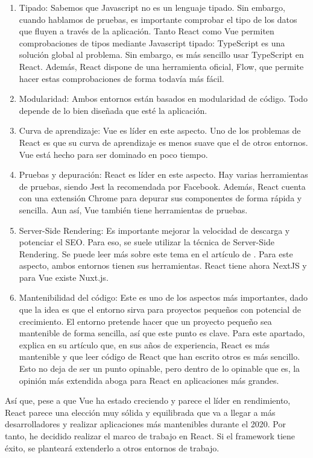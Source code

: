 \begin{enumerate}
	\item Tipado: Sabemos que Javascript no es un lenguaje tipado. Sin embargo, cuando hablamos de pruebas, es importante comprobar el tipo de los datos que fluyen a través de la aplicación. Tanto React como Vue permiten comprobaciones de tipos mediante Javascript tipado: TypeScript es una solución global al problema. Sin embargo, es más sencillo usar TypeScript en React. Además, React dispone de una herramienta oficial, Flow, que permite hacer estas comprobaciones de forma todavía más fácil.
	\item Modularidad: Ambos entornos están basados en modularidad de código. Todo depende de lo bien diseñada que esté la aplicación.
	\item Curva de aprendizaje: Vue es líder en este aspecto. Uno de los problemas de React es que su curva de aprendizaje es menos suave que el de otros entornos. Vue está hecho para ser dominado en poco tiempo.
	\item Pruebas y depuración: React es líder en este aspecto. Hay varias herramientas de pruebas, siendo Jest la recomendada por Facebook. Además, React cuenta con una extensión Chrome para depurar sus componentes de forma rápida y sencilla. Aun así, Vue también tiene herramientas de pruebas.
	\item Server-Side Rendering: Es importante mejorar la velocidad de descarga y potenciar el SEO. Para eso, se suele utilizar la técnica de Server-Side Rendering. Se puede leer más sobre este tema en el artículo de \citet{SSREXP}. Para este aspecto, ambos entornos tienen sus herramientas. React tiene ahora NextJS y para Vue existe Nuxt.js.
	\item Mantenibilidad del código: Este es uno de los aspectos más importantes, dado que la idea es que el entorno sirva para proyectos pequeños con potencial de crecimiento. El entorno pretende hacer que un proyecto pequeño sea mantenible de forma sencilla, así que este punto es clave. Para este apartado, \citet{RVVMNTB} explica en su artículo que, en sus años de experiencia, React es más mantenible y que leer código de React que han escrito otros es más sencillo. Esto no deja de ser un punto opinable, pero dentro de lo opinable que es, la opinión más extendida aboga para React en aplicaciones más grandes.
\end{enumerate}

Así que, pese a que Vue ha estado creciendo y parece el líder en rendimiento, React parece una elección muy sólida y equilibrada que va a llegar a más desarrolladores y realizar aplicaciones más mantenibles durante el 2020. Por tanto, he decidido realizar el marco de trabajo en React. Si el framework tiene éxito, se planteará extenderlo a otros entornos de trabajo.


